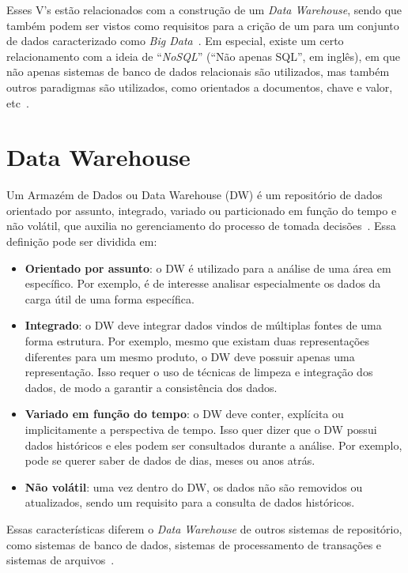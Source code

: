 Esses V's estão relacionados com a construção de um \textit{Data Warehouse}, sendo que também podem ser vistos como requisitos para a crição de um para um conjunto de dados caracterizado como \textit{Big Data}~\cite{zhangBigDataFramework2017}.
Em especial, existe um certo relacionamento com a ideia de ``\textit{NoSQL}'' (``Não apenas SQL'', em inglês), em que não apenas sistemas de banco de dados relacionais são utilizados, mas também outros paradigmas são utilizados, como orientados a documentos, chave e valor, etc~\cite{bimonteOpenIssuesBig2016}.

\section{Data Warehouse}\label{ch:fun:dw}

Um Armazém de Dados ou Data Warehouse (DW) é um repositório de dados orientado por assunto, integrado, variado ou particionado em função do tempo e não volátil, que auxilia no gerenciamento do processo de tomada decisões~\cite{inmonUsingDataWarehouse1994}.
Essa definição pode ser dividida em:

\begin{itemize}
	\item \textbf{Orientado por assunto}: o DW é utilizado para a análise de uma área em específico.
Por exemplo, é de interesse analisar especialmente os dados da carga útil de uma forma específica.
	\item \textbf{Integrado}: o DW deve integrar dados vindos de múltiplas fontes de uma forma estrutura.
Por exemplo, mesmo que existam duas representações diferentes para um mesmo produto, o DW deve possuir apenas uma representação.
Isso requer o uso de técnicas de limpeza e integração dos dados, de modo a garantir a consistência dos dados.
	\item \textbf{Variado em função do tempo}: o DW deve conter, explícita ou implicitamente a perspectiva de tempo.
Isso quer dizer que o DW possui dados históricos e eles podem ser consultados durante a análise.
Por exemplo, pode se querer saber de dados de dias, meses ou anos atrás.
	\item \textbf{Não volátil}: uma vez dentro do DW, os dados não são removidos ou atualizados, sendo um requisito para a consulta de dados históricos.
\end{itemize}

Essas características diferem o \textit{Data Warehouse} de outros sistemas de repositório, como sistemas de banco de dados, sistemas de processamento de transações e sistemas de arquivos~\cite{hanDataMiningConcepts2011}.

